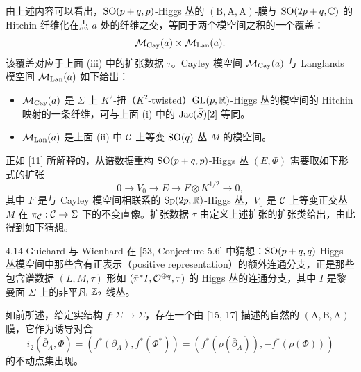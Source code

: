 
由上述内容可以看出，$\mathrm{SO}(p+q,p)$-Higgs 丛的 $(\mathrm{B},\mathrm{A},\mathrm{A})$-膜与 $\mathrm{SO}(2p+q,\mathbb{C})$ 的 Hitchin 纤维化在点 $a$ 处的纤维之交，等同于两个模空间之积的一个覆盖：
\[
    \mathcal{M}_{\mathrm{Cay}}(a) \times \mathcal{M}_{\mathrm{Lan}}(a).
\]
该覆盖对应于上面 (iii) 中的扩张数据 $\tau$。Cayley 模空间 $\mathcal{M}_{\mathrm{Cay}}(a)$ 与 Langlands 模空间 $\mathcal{M}_{\mathrm{Lan}}(a)$ 如下给出：
\begin{itemize}[leftmargin=1.4em,itemsep=1pt,topsep=1pt]
\item $\mathcal{M}_{\mathrm{Cay}}(a)$ 是 $\Sigma$ 上 $K^2$-扭（$K^2$-twisted）$\mathrm{GL}(p,\mathbb{R})$-Higgs 丛的模空间的 Hitchin 映射的一条纤维，可与上面 (i) 中的 $\operatorname{Jac}(\bar S)[2]$ 等同。

\item $\mathcal{M}_{\mathrm{Lan}}(a)$ 是上面 (ii) 中 $\mathcal{C}$ 上等变 $\mathrm{SO}(q)$-丛 $M$ 的模空间。
\end{itemize}

正如 [11] 所解释的，从谱数据重构 $\mathrm{SO}(p+q,p)$-Higgs 丛 $(E,\Phi)$ 需要取如下形式的扩张
\[
    0 \to V_0 \to E \to F\otimes K^{1/2} \to 0,
\]
其中 $F$ 是与 Cayley 模空间相联系的 $\mathrm{Sp}(2p,\mathbb{R})$-Higgs 丛，$V_0$ 是 $\mathcal{C}$ 上等变正交丛 $M$ 在 $\pi_{\mathcal{C}} : \mathcal{C} \to \Sigma$ 下的不变直像。扩张数据 $\tau$ 由定义上述扩张的扩张类给出，由此得到如下猜想。

\begin{conj}{4.14} Guichard 与 Wienhard 在 [53, Conjecture 5.6] 中猜想：$\mathrm{SO}(p+q,q)$-Higgs 丛模空间中那些含有正表示（positive representation）的额外连通分支，正是那些包含谱数据 $(L,M,\tau)$ 形如 $(\bar\pi^*I, \mathcal{O}^{\oplus q}, \tau)$ 的 Higgs 丛的连通分支，其中 $I$ 是黎曼面 $\Sigma$ 上的非平凡 $\mathbb{Z}_2$-线丛。 \end{conj}

 如前所述，给定实结构 $f : \Sigma \to \Sigma$，存在一个由 [15, 17] 描述的自然的 $(\mathrm{A},\mathrm{B},\mathrm{A})$-膜，它作为诱导对合
\[
    i_2(\bar\partial_A,\Phi) = (f^*(\partial_A), f^*(\Phi^*)) = (f^*(\rho(\bar\partial_A)), -f^*(\rho(\Phi)))
\]
的不动点集出现。

